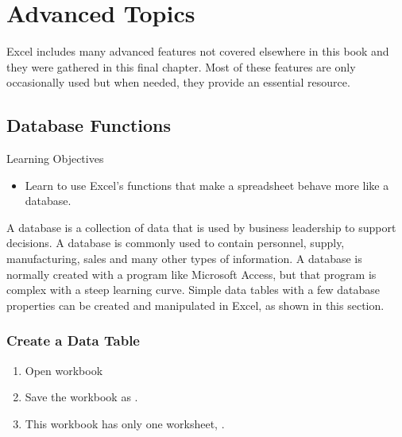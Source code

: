 \chapter{Advanced Topics}\label{ch09:topics}

Excel includes many advanced features not covered elsewhere in this book and they were gathered in this final chapter. Most of these features are only occasionally used but when needed, they provide an essential resource.

\section{Database Functions}

\begin{center}
	\begin{objbox}{Learning Objectives}
		\begin{itemize}
			\setlength{\itemsep}{0pt}
			\setlength{\parskip}{0pt}
			\setlength{\parsep}{0pt}
			
			\item Learn to use Excel's functions that make a spreadsheet behave more like a database.
		\end{itemize}
	\end{objbox}
\end{center}

A database is a collection of data that is used by business leadership to support decisions. A database is commonly used to contain personnel, supply, manufacturing, sales and many other types of information. A database is normally created with a program like Microsoft Access, but that program is complex with a steep learning curve. Simple data tables with a few database properties can be created and manipulated in Excel, as shown in this section.

\subsection{Create a Data Table}

\begin{enumerate}
	\item Open workbook 
	\item Save the workbook as .
	\item This workbook has only one worksheet, .
\end{enumerate}

